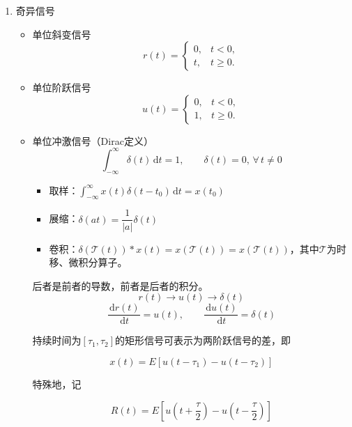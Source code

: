 \documentclass[UTF8,fontset=fandol,zihao=5]{ctexart}
\newcommand{\dd}{\,\mathrm{d}}
\begin{document}
\begin{enumerate}
    \item 奇异信号
    
    \begin{itemize}
      \item 单位斜变信号
      \[
      r(t)=
        \begin{cases}
        0, & t < 0,\\
        t, & t \geq 0.
        \end{cases}
      \]
      \item 单位阶跃信号
      \[
      u(t)=
        \begin{cases}
        0, & t < 0,\\
        1, & t \geq 0.
        \end{cases}
      \]
      \item 单位冲激信号（Dirac定义）
      \[
      \int_{-\infty}^{\infty} \delta(t) \dd t = 1, \qquad \delta(t) = 0, \, \forall \, t \neq 0
      \]

      \begin{methodbox}[【技巧】单位冲激信号性质]
        \begin{itemize}
          \item 取样：$\displaystyle \int_{-\infty}^{\infty} x(t) \delta(t-t_0) \dd t = x(t_0) $
          \item 展缩：$\delta(at) = \dfrac{1}{|a|} \delta(t)$
          \item 卷积：$\delta(\mathcal{T}(t)) \ast x(t) = x(\mathcal{T}(t)) = x(\mathcal{T}(t))$，其中$\mathcal{T}$为时移、微积分算子。
        \end{itemize}
      \end{methodbox}

      \begin{methodbox}[【技巧】三奇异信号关系]
        后者是前者的导数，前者是后者的积分。
        \[
        r(t) \to u(t) \to \delta(t)
        \]
        \[
        \dfrac{\dd r(t)}{\dd t} = u(t), \qquad \dfrac{\dd u(t)}{\dd t} = \delta(t)
        \]
      \end{methodbox}

      \begin{methodbox}[矩形信号]
        持续时间为$[\tau_1, \tau_2]$的矩形信号可表示为两阶跃信号的差，即
        
        \[
        x(t) = E \left [ u(t-\tau_1) - u(t-\tau_2) \right ]
        \]

        特殊地，记
        
        \[
        R(t) = E \left [ u\left(t+\frac{\tau}{2}\right) - u\left(t-\frac{\tau}{2}\right) \right ]
        \]
      \end{methodbox}


\end{itemize}
\end{enumerate}
\end{document}
